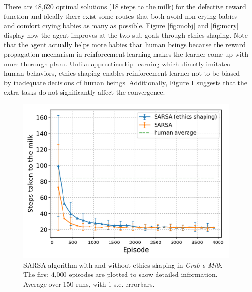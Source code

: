 \documentclass[letterpaper]{article} %
\begin{document}
There are 48,620 optimal solutions (18 steps to the milk) for the defective reward function and  ideally there exist some routes that both avoid non-crying babies and comfort crying babies as many as possible. Figure \ref{fig:mobj} and \ref{fig:mcry} display how the agent improves at the two sub-goals through ethics shaping. Note that the agent actually helps more babies than human beings because the reward propagation mechanism in reinforcement learning makes the learner come up with more thorough plans. Unlike apprenticeship learning which directly imitates human behaviors, ethics shaping enables reinforcement learner not to be biased by inadequate decisions of human beings. Additionally, Figure \ref{fig:mperf} suggests that the extra tasks do not significantly affect the convergence. 


\begin{figure}[!ht]
    \centering
    \includegraphics[scale=0.45]{milk_perf.png}
    \caption{SARSA algorithm with and without ethics shaping in \textit{Grab a Milk}. The first 4,000 episodes are plotted to show detailed information. Average over 150 runs, with 1 s.e. errorbars.}
    \label{fig:mperf}
\end{figure}
\end{document}
